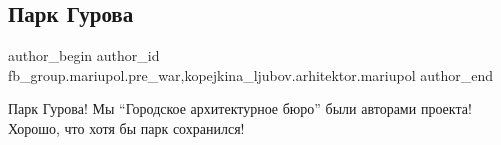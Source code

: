  
 
 
 
 

\subsection{Парк Гурова}
\label{sec:12_02_2023.fb.fb_group.mariupol.pre_war.1.park_gurova}
 
\ifcmt
 author_begin
   author_id fb_group.mariupol.pre_war,kopejkina_ljubov.arhitektor.mariupol
 author_end
\fi

Парк Гурова! Мы \enquote{Городское архитектурное бюро} были авторами проекта!
Хорошо, что хотя бы парк сохранился!

